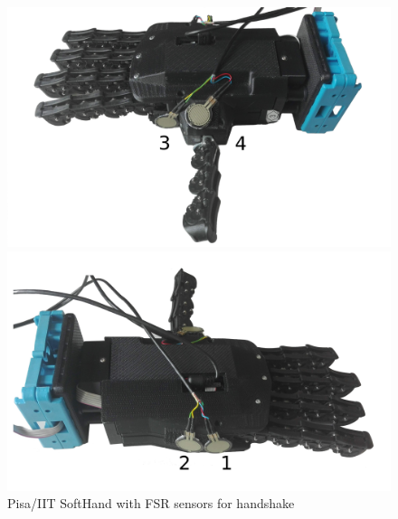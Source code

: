 \begin{figure}[h]
  \centering
  \begin{minipage}[b]{0.4\textwidth}
    \includegraphics[width=\textwidth]{Figure/qbhand1.png}
    
  \end{minipage}
  \hfill
  \begin{minipage}[b]{0.4\textwidth}
    \includegraphics[width=\textwidth]{Figure/qbhand2.png}
  \end{minipage}
  \label{fig:sensorsONhand}
  \caption{Pisa/IIT SoftHand with FSR sensors for handshake}
\end{figure}

